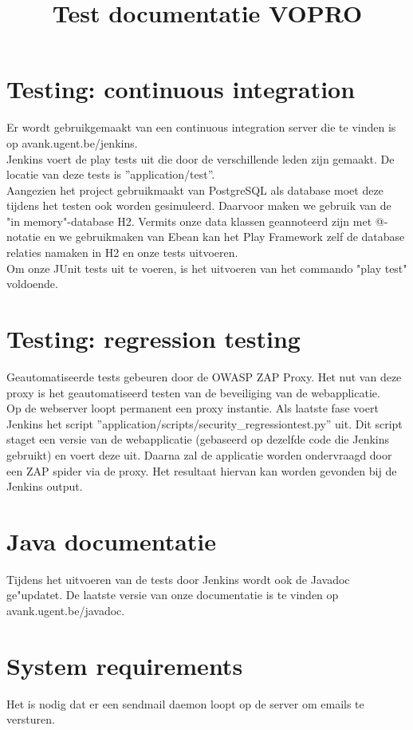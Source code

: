 \documentclass[10pt,a4paper]{article}
\title{Test documentatie VOPRO}
\begin{document}
\section*{Testing: continuous integration}
Er wordt gebruikgemaakt van een continuous integration server die te vinden is op avank.ugent.be/jenkins.\\
Jenkins voert de play tests uit die door de verschillende leden zijn gemaakt. De locatie van deze tests is ''application/test''. \\

Aangezien het project gebruikmaakt van PostgreSQL als database moet deze tijdens het testen ook worden gesimuleerd. Daarvoor maken we gebruik van de "in memory"-database H2. Vermits onze data klassen geannoteerd zijn met @-notatie en we gebruikmaken van Ebean kan het Play Framework zelf de database relaties namaken in H2 en onze tests uitvoeren.\\

Om onze JUnit tests uit te voeren, is het uitvoeren van het commando "play test" voldoende.

\section*{Testing: regression testing}
Geautomatiseerde tests gebeuren door de OWASP ZAP Proxy. Het nut van deze proxy is het geautomatiseerd testen van de beveiliging van de webapplicatie. \\
Op de webserver loopt permanent een proxy instantie. Als laatste fase voert Jenkins het script ''application/scripts/security\_regressiontest.py'' uit. Dit script staget een versie van de webapplicatie (gebaseerd op dezelfde code die Jenkins gebruikt) en voert deze uit. Daarna zal de applicatie worden ondervraagd door een ZAP spider via de proxy. Het resultaat hiervan kan worden gevonden bij de Jenkins output. 

\section*{Java documentatie}
Tijdens het uitvoeren van de tests door Jenkins wordt ook de Javadoc ge"updatet. 
De laatste versie van onze documentatie is te vinden op avank.ugent.be/javadoc.

\section*{System requirements}
Het is nodig dat er een sendmail daemon loopt op de server om emails te versturen.
\end{document}

